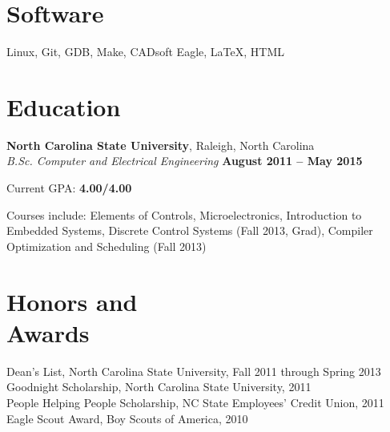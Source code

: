 \documentclass[margin,line,letterpaper]{resume}
\begin{document}
\begin{resume}
    \section{\mysidestyle Software}
    Linux, Git, GDB, Make, CADsoft Eagle, \LaTeX, HTML

    \section{\mysidestyle Education}

    \textbf{North Carolina State University}, Raleigh, North Carolina \vspace{2mm}\\\vspace{1mm}%
    \textsl{B.Sc. Computer and Electrical Engineering} \hfill \textbf{August 2011 -- May 2015}\vspace{-3mm}\\\vspace{-1mm}%
    \begin{list2}
        \item Current GPA: \textbf{4.00/4.00}
        \item Courses include: Elements of Controls, Microelectronics, Introduction to Embedded Systems,
            Discrete Control Systems (Fall 2013, Grad), Compiler Optimization and Scheduling (Fall 2013)
    \end{list2}\vspace{-1.5mm}


    \section{\mysidestyle Honors and\\Awards}

    Dean's List, North Carolina State University, Fall 2011 through Spring 2013   \vspace{-8mm}\\%

    Goodnight Scholarship, North Carolina State University, 2011              \vspace{-8mm}\\%

    People Helping People Scholarship, NC State Employees' Credit Union, 2011 \vspace{-8mm}\\%

    Eagle Scout Award, Boy Scouts of America, 2010


\end{resume}
\end{document}
